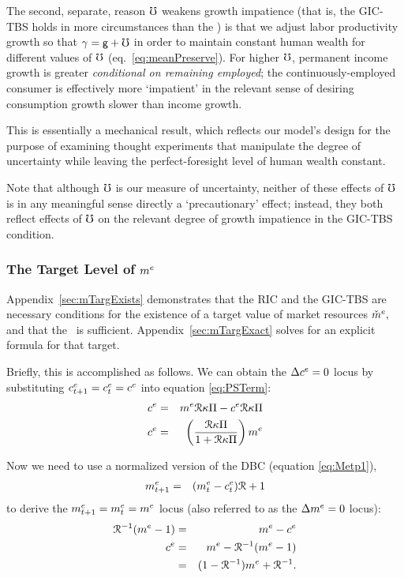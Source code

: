 \documentclass{handout}
\begin{document}
The second, separate, reason $\mho$ weakens growth impatience (that is, the GIC-TBS holds in more circumstances than the \GICWGro) is that we adjust labor productivity growth so that $\gamma=\mathsf{g}+\mho$ in 
order to maintain constant human wealth for different values of
$\mho$ (eq.\ \eqref{eq:meanPreserve}).  For higher
$\mho$, permanent income growth is greater {\it conditional on
  remaining employed}; the continuously-employed consumer is effectively
more `impatient' in the relevant sense of desiring consumption growth
slower than income growth.

This is essentially a mechanical result, which reflects our model's
design for the purpose of examining thought experiments that
manipulate the degree of uncertainty while leaving the
perfect-foresight level of human wealth constant.  

Note that although $\mho$ is our measure of uncertainty, neither of 
these effects of $\mho$ is in any meaningful sense directly a 
`precautionary' effect; instead, they both reflect effects of 
$\mho$ on the relevant degree of growth impatience in the GIC-TBS 
condition.  

\subsubsection{The Target Level of $m^{e}$}
\renewcommand{\tSS}{\null}

Appendix~\ref{sec:mTargExists} demonstrates that the RIC and the GIC-TBS are necessary conditions for the existence of a target value of market resources $\check{m}^{e},$ and that the \GICPGro~is sufficient.   Appendix~\ref{sec:mTargExact} solves for an explicit formula for that target.

Briefly, this is accomplished as follows.  We can obtain the $\Delta c^{e}=0$ locus by substituting
$c^{e}_{t+1}=c^{e}_{t}=c^{e}$ into equation \eqref{eq:PSTerm}:
\begin{eqnarray}
  \cRatE_{\tSS} & = & \mRatE_{\tSS} \Rnorm\MPCU\straight - \cRatE_{\tSS} \Rnorm\MPCU\straight
\\  \cRatE_{\tSS} & = & \left(\frac{\Rnorm\MPCU\straight}{1+\Rnorm\MPCU\straight}\right)\mRatE
 \label{eq:DceEq0} \label{eq:cDelEqZero}
\end{eqnarray}

Now we need to use a normalized version of the DBC (equation \eqref{eq:Metp1}),
\begin{eqnarray}
        m^{e}_{t+1} & = & (m^{e}_{t}-c^{e}_{t})\mathcal{R}+1 \label{eq:metp1}
\end{eqnarray}
to derive the $\mRatE_{t+1}=\mRatE_{t}=\mRatE_{\tSS}$ locus (also referred
to as the $\Delta m^{e}=0$ locus): 
\begin{eqnarray}
      \Rnorm^{-1}(\mRatE_{\tSS}-1) & = & \mRatE_{\tSS}-\cRatE_{\tSS}
\\      \cRatE_{\tSS} & = & \mRatE_{\tSS}-\Rnorm^{-1}(\mRatE_{\tSS}-1)
\\       & = & (1-\Rnorm^{-1})\mRatE_{\tSS}+\Rnorm^{-1}. \label{eq:mDelEqZero}
\end{eqnarray}
\end{document}
